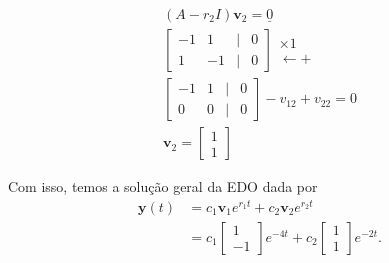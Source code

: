 \begin{resol}
    \begin{gather}
    (A-r_2I)\pmb{v}_2 = \underline{0} \\
    \begin{bmatrix}
      -1 & 1 & | & 0\\
      1 & -1 & | & 0
    \end{bmatrix}
    \begin{matrix}
      \times 1 \\
      \leftarrow +
    \end{matrix}\\
    \begin{bmatrix}
      -1 & 1 & | & 0\\
      0 & 0 & | & 0
    \end{bmatrix}
    -v_{12}+v_{22}=0\\
    \pmb{v}_2 =
    \begin{bmatrix}
      1\\
      1
    \end{bmatrix}
  \end{gather}

  Com isso, temos a solução geral da EDO dada por
  \begin{align}
    \pmb{y}(t) &= c_1\pmb{v}_1e^{r_1t} + c_2\pmb{v}_2e^{r_2t} \\
               &= c_1
                 \begin{bmatrix}
                   1 \\
                   -1
                 \end{bmatrix}e^{-4t} + c_2
    \begin{bmatrix}
      1 \\
      1
    \end{bmatrix}e^{-2t}.
  \end{align}


\end{resol}

